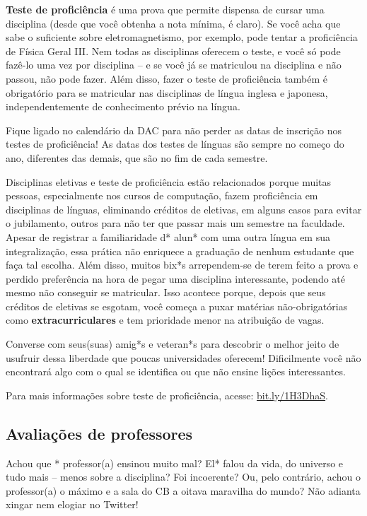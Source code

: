 \textbf{Teste de proficiência} é uma prova que permite dispensa de cursar uma
disciplina (desde que você obtenha a nota mínima, é claro). Se você acha que
sabe o suficiente sobre eletromagnetismo, por exemplo, pode tentar a
proficiência de Física Geral III.  Nem todas as disciplinas oferecem o teste, e
você só pode fazê-lo uma vez por disciplina -- e se você já se matriculou na
disciplina e não passou, não pode fazer.  Além disso, fazer o teste de
proficiência também é obrigatório para se matricular nas disciplinas de língua
inglesa e japonesa, independentemente de conhecimento prévio na língua.

Fique ligado no calendário da DAC para não perder as datas de inscrição nos
testes de proficiência! As datas dos testes de línguas são sempre no começo do
ano, diferentes das demais, que são no fim de cada semestre.

Disciplinas eletivas e teste de proficiência estão relacionados porque muitas
pessoas, especialmente nos cursos de computação, fazem proficiência em
disciplinas de línguas, eliminando créditos de eletivas, em alguns casos para
evitar o jubilamento, outros para não ter que passar mais um semestre na
faculdade. Apesar de registrar a familiaridade d* alun* com uma outra língua em
sua integralização, essa prática não enriquece a graduação de nenhum estudante
que faça tal escolha. Além disso, muitos bix*s arrependem-se de terem feito a
prova e perdido preferência na hora de pegar uma disciplina interessante,
podendo até mesmo não conseguir se matricular. Isso acontece porque, depois que
seus créditos de eletivas se esgotam, você começa a puxar matérias
não-obrigatórias como \textbf{extracurriculares} e tem prioridade menor na
atribuição de vagas.

Converse com seus(suas) amig*s e veteran*s para descobrir o melhor jeito de
usufruir dessa liberdade que poucas universidades oferecem! Dificilmente você
não encontrará algo com o qual se identifica ou que não ensine lições
interessantes.

Para mais informações sobre teste de proficiência, acesse: \url{bit.ly/1H3DhaS}.

\subsection{Avaliações de professores}

Achou que * professor(a) ensinou muito mal? El* falou da vida, do universo e
tudo mais -- menos sobre a disciplina? Foi incoerente? Ou, pelo contrário, achou
o professor(a) o máximo e a sala do CB a oitava maravilha do mundo? Não adianta
xingar nem elogiar no Twitter!

